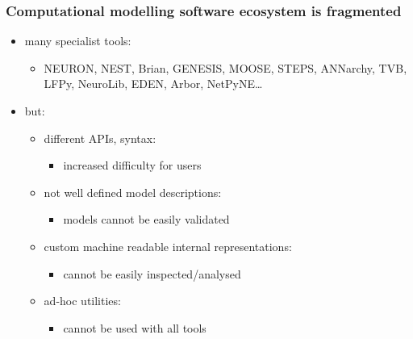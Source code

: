 \begin{frame}[c]
  \frametitle{Computational modelling software ecosystem is fragmented}
  \begin{itemize}
    \item many specialist tools:
      \begin{itemize}
        \item NEURON, NEST, Brian, GENESIS, MOOSE, STEPS, ANNarchy, TVB, LFPy, NeuroLib, EDEN, Arbor, NetPyNE\ldots{}
      \end{itemize}
    \item<2-> but:
      \begin{itemize}
        \item<2-> different APIs, syntax:
          \begin{itemize}
            \item<2-> increased difficulty for users
          \end{itemize}
        \item<3-> not well defined model descriptions:
          \begin{itemize}
            \item<3-> models cannot be easily validated
          \end{itemize}
        \item<4-> custom machine readable internal representations:
          \begin{itemize}
            \item<4-> cannot be easily inspected/analysed
          \end{itemize}
        \item<5-> ad-hoc utilities:
          \begin{itemize}
            \item<5->  cannot be used with all tools
          \end{itemize}
      \end{itemize}
  \end{itemize}
\end{frame}
